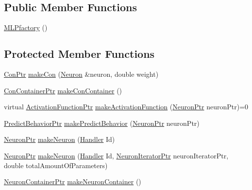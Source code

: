 \subsection*{Public Member Functions}
\begin{DoxyCompactItemize}
\item 
\hyperlink{class_m_l_pfactory_a61dfce37d0344c58e275e8508b0a474c}{MLPfactory} ()
\end{DoxyCompactItemize}
\subsection*{Protected Member Functions}
\begin{DoxyCompactItemize}
\item 
\hyperlink{_a_m_o_r_e_8h_a169bb8e5f26ce70bf2b10dec2fb5ee50}{ConPtr} \hyperlink{class_m_l_pfactory_ac47beb4aced10b9c99414ba7dd7c8b55}{makeCon} (\hyperlink{class_neuron}{Neuron} \&neuron, double weight)
\item 
\hyperlink{_a_m_o_r_e_8h_a1021dbaf961d1c8da6d58a8566e5778b}{ConContainerPtr} \hyperlink{class_m_l_pfactory_a69562b8fd06c60a2d5db66d8b0f10299}{makeConContainer} ()
\item 
virtual \hyperlink{_a_m_o_r_e_8h_a77602a0277a02e5769c3df0adc669b17}{ActivationFunctionPtr} \hyperlink{class_m_l_pfactory_a92109ea285be7dd847d359a1ade9064a}{makeActivationFunction} (\hyperlink{_a_m_o_r_e_8h_ac1ea936c2c7728eb382278131652fef4}{NeuronPtr} neuronPtr)=0
\item 
\hyperlink{_a_m_o_r_e_8h_a1fb2f1f8fdf1e08c42ef4bdce436af93}{PredictBehaviorPtr} \hyperlink{class_m_l_pfactory_a9e9e9bb4390df09c78a24c4ff79cdab6}{makePredictBehavior} (\hyperlink{_a_m_o_r_e_8h_ac1ea936c2c7728eb382278131652fef4}{NeuronPtr} neuronPtr)
\item 
\hyperlink{_a_m_o_r_e_8h_ac1ea936c2c7728eb382278131652fef4}{NeuronPtr} \hyperlink{class_m_l_pfactory_a6dd50bc994fa69d7c4de183284efdae2}{makeNeuron} (\hyperlink{_a_m_o_r_e_8h_abc871abb71cff6655b8172ee7240b8ef}{Handler} Id)
\item 
\hyperlink{_a_m_o_r_e_8h_ac1ea936c2c7728eb382278131652fef4}{NeuronPtr} \hyperlink{class_m_l_pfactory_a9e3c7140a702a12d7a7fde8ad52b6b04}{makeNeuron} (\hyperlink{_a_m_o_r_e_8h_abc871abb71cff6655b8172ee7240b8ef}{Handler} Id, \hyperlink{_a_m_o_r_e_8h_aa794539c0a68e4eb451e7a2cc6294acc}{NeuronIteratorPtr} neuronIteratorPtr, double totalAmountOfParameters)
\item 
\hyperlink{_a_m_o_r_e_8h_a6157c259718f98f808c85d7f77048970}{NeuronContainerPtr} \hyperlink{class_m_l_pfactory_a174caa9d45bc964a07d86f6221e576e1}{makeNeuronContainer} ()
\end{DoxyCompactItemize}


